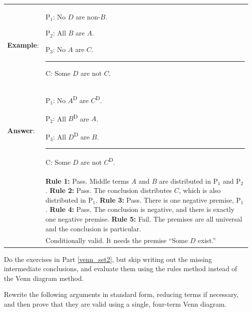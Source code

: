 {\begin{longtabu}{p{.1\linewidth}p{.9\linewidth}}
\textbf{Example}: & \vspace{-16pt} \begin{earg} 
\item[P$_1$:] No $D$ are non-$B$.
\item[P$_2$:] All $B$ are $A$. 
\item[P$_3$:] No $A$ are $C$. 
\vspace{-.5em} 
\item [] \rule{0.3\linewidth}{.5pt} 
\item[C:] Some $D$ are not $C$. 
\end{earg} \\
\textbf{Answer}: & \vspace{-16pt} \begin{earg} 
\item[P$_1$:] No $A$\textsuperscript{D} are $C$\textsuperscript{D}.
\item[P$_2$:] All $B$\textsuperscript{D} are $A$. %
\item[P$_3$:] All $D$\textsuperscript{D} are $B$.
\vspace{-.5em} 
\item [] \rule{0.3\linewidth}{.5pt} 
\item[C:] Some $D$ are not $C$\textsuperscript{D}. 
\end{earg}
\\ & 
\textbf{Rule 1:} Pass. Middle terms $A$ and $B$ are distributed in P$_1$ and P$_2$. \newline
\textbf{Rule 2:} Pass. The conclusion distributes $C$, which is also distributed in  P$_1$.\newline
\textbf{Rule 3:} Pass. There is one negative premise, P$_1$. \newline
\textbf{Rule 4:} Pass. The conclusion is negative, and there is exactly one negative premise.\newline
\textbf{Rule 5:} Fail. The premises are all universal and the conclusion is particular. \\
& Conditionally valid. It needs the premise ``Some $D$ exist.''
\end{longtabu}


\noindent\problempart Do the exercises in Part \ref{venn_set2}, but skip writing out the missing intermediate conclusions, and evaluate them using the rules method instead of the Venn diagram method.


\noindent\problempart  Rewrite the following arguments in standard form, reducing terms if necessary, and then prove that they are valid using a single, four-term Venn diagram.

}

